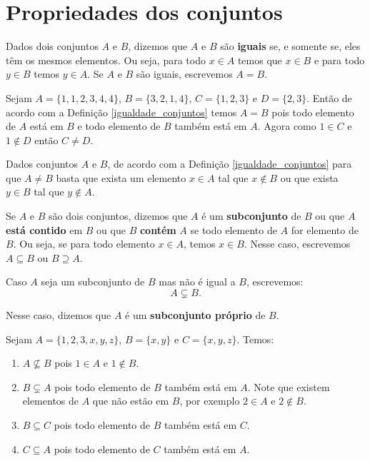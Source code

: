 \section{Propriedades dos conjuntos}

\begin{definicao}\label{igualdade_conjuntos}
	Dados dois conjuntos $A$ e $B$, dizemos que $A$ e $B$ s{\~a}o \textbf{iguais} se, e somente se, eles t{\^e}m os mesmos elementos. Ou seja, para todo $x \in A$ temos que $x \in B$ e para todo $y \in B$ temos $y \in A$. Se $A$ e $B$ s{\~a}o iguais, escrevemos $A = B$.
\end{definicao}

\begin{exemplo}
	Sejam $A = \{1,1,2,3,4,4\}$, $B = \{3,2,1,4\}$, $C = \{1,2,3\}$ e $D = \{2,3\}$. Ent\~ao de acordo com a Defini\c{c}\~ao \ref{igualdade_conjuntos} temos $A = B$ pois todo elemento de $A$ est\'a em $B$ e todo elemento de $B$ tamb\'em est\'a em $A$. Agora como $1 \in C$ e $1 \notin D$ ent\~ao $C \ne D$.
\end{exemplo}

\begin{observacao}
	Dados conjuntos $A$ e $B$, de acordo com a Defini\c{c}\~ao \ref{igualdade_conjuntos} para que $A \ne B$ basta que exista um elemento $x \in A$ tal que $x \notin B$ ou que exista $y \in B$ tal que $y \notin A$.
\end{observacao}
	
\begin{definicao}\label{definicao_continencia_conjuntos}
	Se $A$ e $B$ s{\~a}o dois conjuntos, dizemos que $A$ {\'e} um \textbf{subconjunto} de $B$ ou que $A$ \textbf{est\'a contido} em $B$ ou que $B$ \textbf{cont\'em} $A$ se todo elemento de $A$ for elemento de $B$. Ou seja, se para todo elemento $x \in A$, temos $x \in B$. Nesse caso, escrevemos $A \subseteq B$ ou $B \supseteq A$.
\end{definicao}


Caso $A$ seja um subconjunto de $B$ mas n{\~a}o {\'e} igual a $B$, escrevemos:
\[
A \subsetneq B.
\]

Nesse caso, dizemos que $A$ {\'e} um \textbf{subconjunto pr{\'o}prio} de $B$.

\begin{exemplos}
	Sejam $A = \{1,2,3,x,y,z\}$, $B = \{x, y\}$ e $C = \{x, y , z\}$. Temos:
	\begin{enumerate}[label={\arabic*})]
		\item $A \nsubseteq B$ pois $1 \in A$ e $1 \notin B$.
		\item $B \subsetneq A$ pois todo elemento de $B$ tamb\'em est\'a em $A$. Note que existem elementos de $A$ que n\~ao est\~ao em $B$, por exemplo $2 \in A$ e $2 \notin B$.
		\item $B \subseteq C$ pois todo elemento de $B$ tamb\'em est\'a em $C$.
		\item $C \subseteq A$ pois todo elemento de $C$ tamb\'em est\'a em $A$.
	\end{enumerate}
\end{exemplos}

